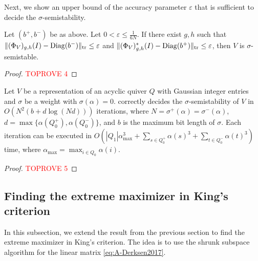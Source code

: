 \documentclass[a4paper,11pt]{article}
\numberwithin{equation}{section}
\newcommand{\eps}{\varepsilon}
\DeclareMathOperator{\tr}{tr}
\DeclareMathOperator{\Diag}{Diag}
\DeclarePairedDelimiter{\norm}{\lVert}{\rVert}
\begin{document}
Next, we show an upper bound of the accuracy parameter $\eps$ that is sufficient to decide the $\sigma$-semistability.

\begin{lemma}\label{lem:scaling-ss-eps}
    Let $(b^+, b^-)$ be as above.
    Let 
    $
    0 < \eps \leq \frac{1}{6N}.
    $
    If there exist $g, h$ such that $\norm{(\Phi_V)_{g,h}(I) - \Diag(b^-)}_{\tr} \leq \eps$ and $\norm{(\Phi_V)_{g,h}^*(I) - \Diag(b^+)}_{\tr} \leq \eps$, then $V$ is $\sigma$-semistable.
\end{lemma}
\begin{proof}\textcolor{red}{TOPROVE 4}\end{proof}


\begin{theorem}\label{thm:ss}
    Let $V$ be a representation of an acyclic quiver $Q$ with Gaussian integer entries and $\sigma$ be a weight with $\sigma(\alpha) = 0$.
     correctly decides the $\sigma$-semistability of $V$ in $O(N^2(b + d \log (Nd)))$ iterations, where $N = \sigma^+(\alpha) = \sigma^-(\alpha)$, $d = \max\{\alpha(Q_0^+), \alpha(Q_0^-)\}$, and $b$ is the maximum bit length of $\sigma$.
    Each iteration can be executed in $O(|Q_1|\alpha_{\max}^3 + \sum_{s \in Q_0^+} \alpha(s)^3 + \sum_{t \in Q_0^-} \alpha(t)^3)$ time, where $\alpha_{\max} = \max_{i \in Q_0} \alpha(i)$.
\end{theorem}
\begin{proof}\textcolor{red}{TOPROVE 5}\end{proof}


\subsection{Finding the extreme maximizer in King's criterion}
In this subsection, we extend the result from the previous section to find the extreme maximizer in King's criterion.
The idea is to use the shrunk subspace algorithm for the linear matrix \eqref{eq:A-Derksen2017}.
\end{document}
